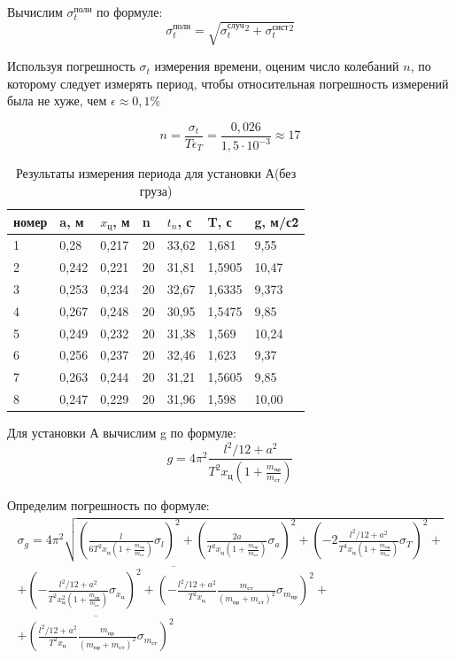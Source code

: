 \documentclass[a4paper,12pt]{article}
\begin{document}
Вычислим $\sigma_{t}^{\mbox{полн}}$ по формуле:
\begin{equation}
\sigma_{t}^{\mbox{полн}}=\sqrt{\sigma_{t}^{\mbox{случ}}^2+\sigma_{t}^{\mbox{сист}}^2}
\end{equation}

Используя погрешность $\sigma_{t}$ измерения времени, оценим число колебаний $n$, по которому следует измерять период, чтобы относительная погрешность измерений была не хуже, чем $\epsilon \approx 0,1\%$

\begin{equation}
n=\frac{\sigma_{t}}{T\epsilon_T} = \frac{0,026} {1,5\cdot10^{-3}} \approx 17
\end{equation}

\begin{table}[H]
\centering
\caption{Результаты измерения периода для установки А(без груза)}
\begin{tabular}{|l|l|l|l|l|l|l|}
\hline
номер & a, м & $x_{\mbox{ц}}$, м & n & $t_n$, с & T, с & g, м/с\^2 \\ \hline
1 & 0,28 & 0,217 & 20 & 33,62 & 1,681 & 9,55\\ \hline
2 & 0,242 & 0,221 & 20 & 31,81 & 1,5905 & 10,47\\ \hline
3 & 0,253 & 0,234 & 20 & 32,67 & 1,6335 & 9,373\\ \hline
4 & 0,267 & 0,248 & 20 & 30,95 & 1,5475 & 9,85\\ \hline
5 & 0,249 & 0,232 & 20 & 31,38 & 1,569 & 10,24\\ \hline
6 & 0,256 & 0,237 & 20 & 32,46 & 1,623 & 9,37\\ \hline
7 & 0,263 & 0,244 & 20 & 31,21 & 1,5605 & 9,85\\ \hline
8 & 0,247 & 0,229 & 20 & 31,96 & 1,598 & 10,00\\ \hline
\end{tabular}
\end{table}

Для установки А вычислим g по формуле:
\begin{equation}
g = 4 \pi^{2} \frac{l^{2}/12 + a^{2}}{T^{2}x_{\mbox{ц}}(1+\frac{m_{\mbox{пр}}}{m_{\mbox{ст}}})}
\end{equation}

Определим погрешность по формуле:
\begin{eqnarray}
\sigma_{g} = 4\pi^{2} \sqrt{ (\frac{l}{6T^{2}x_{\mbox{ц}}(1+\frac{m_{\mbox{пр}}}{m_{\mbox{ст}}})}\sigma_{l})^{2} + (\frac{2a}{T^{2}x_{\mbox{ц}}(1+\frac{m_{\mbox{пр}}}{m_{\mbox{ст}}})}\sigma_{a})^{2} + (-2\frac{l^{2}/12 + a^{2}}{T^{3}x_{\mbox{ц}}(1+\frac{m_{\mbox{пр}}}{m_{\mbox{ст}}})} \sigma_{T})^{2}+}\nonumber \\
\overline{+ (-\frac{l^{2}/12 + a^{2}}{T^{2}x_{\mbox{ц}}^2(1+\frac{m_{\mbox{пр}}}{m_{\mbox{ст}}})}\sigma_{x_{\mbox{ц}}})^{2} + (-\frac{l^{2}/12 + a^{2}}{T^{2}x_{\mbox{ц}}}\frac{m_{\mbox{ст}}}{(m_{\mbox{пр}} + m_{\mbox{ст}})^2}\sigma_{m_{\mbox{пр}}})^{2}+}\nonumber \\
\overline{+ (\frac{l^{2}/12 + a^{2}}{T^{2}x_{\mbox{ц}}}\frac{m_{\mbox{пр}}}{(m_{\mbox{пр}} + m_{\mbox{ст}})^2}\sigma_{m_{\mbox{ст}}})^{2}}
\end{eqnarray}
\end{document}
